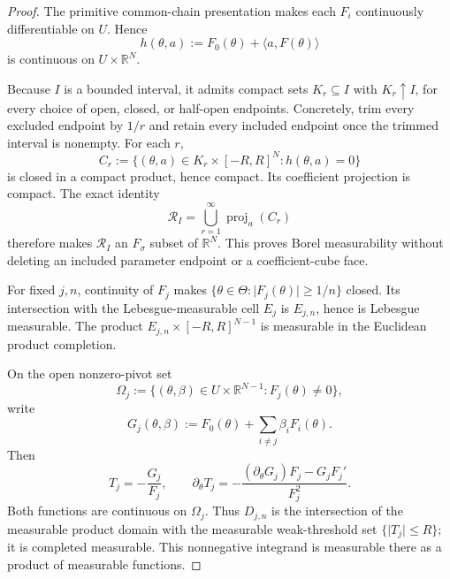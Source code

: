 \begin{proof}
The primitive common-chain presentation makes each \(F_i\) continuously
differentiable on \(U\). Hence
\begin{equation}
\label{eq:appendix-display-061}
h(\theta,a):=F_0(\theta)+\langle a,F(\theta)\rangle
\end{equation}
is continuous on \(U\times\mathbb R^N\).

Because \(I\) is a bounded interval, it admits compact sets \(K_r\subseteq I\) with
\(K_r\uparrow I\), for every choice of open, closed, or half-open endpoints. Concretely, trim every excluded
endpoint by \(1/r\) and retain every included endpoint once the trimmed interval is nonempty. For each \(r\),
\begin{equation}
\label{eq:appendix-display-062}
C_r:=\{(\theta,a)\in K_r\times[-R,R]^N:h(\theta,a)=0\}
\end{equation}
is closed in a compact product, hence compact. Its coefficient projection is compact. The exact identity
\begin{equation}
\label{eq:appendix-display-063}
\mathcal R_I=\bigcup_{r=1}^{\infty}\operatorname{proj}_a(C_r)
\end{equation}
therefore makes \(\mathcal R_I\) an \(F_\sigma\) subset of \(\mathbb R^N\). This proves Borel measurability
without deleting an included parameter endpoint or a coefficient-cube face.

For fixed \(j,n\), continuity of \(F_j\) makes
\(\{\theta\in\Theta:\lvert F_j(\theta)\rvert\geq1/n\}\) closed. Its intersection with the
Lebesgue-measurable cell \(E_j\) is \(E_{j,n}\), hence is Lebesgue measurable. The product
\(E_{j,n}\times[-R,R]^{N-1}\) is measurable in the Euclidean product completion.

On the open nonzero-pivot set
\begin{equation}
\label{eq:appendix-display-064}
\Omega_j:=\{(\theta,\beta)\in U\times\mathbb R^{N-1}:F_j(\theta)\neq0\},
\end{equation}
write
\begin{equation}
\label{eq:appendix-display-065}
G_j(\theta,\beta)
:=F_0(\theta)+\sum_{i\neq j}\beta_iF_i(\theta).
\end{equation}
Then
\begin{equation}
\label{eq:appendix-display-066}
T_j=-\frac{G_j}{F_j},
\qquad
\partial_\theta T_j
=-\frac{(\partial_\theta G_j)F_j-G_jF_j'}{F_j^2}.
\end{equation}
Both functions are continuous on \(\Omega_j\). Thus \(D_{j,n}\) is the intersection of the measurable
product domain with the measurable weak-threshold set
\(\{\lvert T_j\rvert\leq R\}\); it is completed measurable. This nonnegative integrand is
measurable there as a product of measurable functions.


\end{proof}
